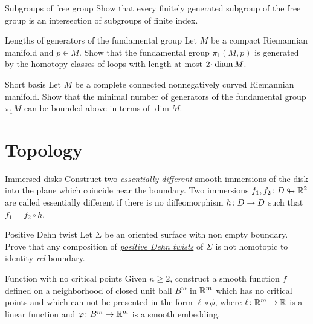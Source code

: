 \documentclass[twoside]{book}
\begin{document}
{\begin{pr}{\easy}{Subgroups of free group}\label{Subgroups of free group}
Show that every finitely generated subgroup of the free group 
is an intersection of subgroups of finite index.
\end{pr}

\begin{pr}{\easy}{Lengths of generators of the fundamental group}\label{Lengths of generators of the fundamental group}
Let $M$ be a compact Riemannian manifold and $p\in M$.
Show that the fundamental group $\pi_1(M,p)$
is generated by the homotopy classes of loops with length at most $2\cdot\diam M$.
\end{pr}

\begin{pr}{}{Short basis}\label{Short basis}
Let $M$ be a complete connected nonnegatively curved Riemannian manifold.
Show that the minimal number of generators of the fundamental group $\pi_1 M$
can be bounded above in terms of $\dim M$.
\end{pr}



\chapter{Topology}

\begin{pr}{}{Immersed disks}\label{Immersed disks} 
Construct two \emph{essentially different} smooth immersions of the disk 
into the plane which coincide near the boundary. 
Two immersions $f_1,f_2\colon D\looparrowright \mathbb{R}^2$ are called essentially different 
if there is no diffeomorphism $h\:D\z\to D$ such that
$f_1=f_2\circ h$.
\end{pr}

\begin{pr}{\easy}{Positive Dehn twist}\label{Positive Dehn twist} Let $\Sigma$ be an oriented surface with non empty boundary.
Prove that any composition of \hyperref[Dehn twist]{\emph{positive Dehn twists}} of $\Sigma$ is not homotopic to identity \emph{rel} boundary.
\end{pr}

\begin{pr}{\many}{Function with no critical points}\label{Function with no critical points}
Given $n\ge 2$, construct a smooth function $f$ defined on a neighborhood of closed unit ball $B^m$ in $\mathbb{R}^m$ which has no critical points and which can not be presented in the form $\ell\circ\phi$, 
where $\ell\colon\mathbb{R}^m\to\mathbb{R}$ is a linear function and $\varphi\colon B^m\to\mathbb{R}^m$ is a smooth embedding.
\end{pr}

}
\end{document}
